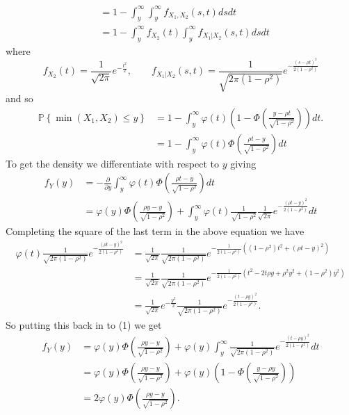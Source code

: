 \documentclass[12pt]{article}
\theoremstyle{definition}
\begin{document}
\begin{enumerate}
\begin{enumerate}
\begin{align*}
&= 1 - \int_{y}^{\infty} \int_y^{\infty} f_{X_1,X_2}(s,t)dsdt \\
&= 1 -\int_y^{\infty} f_{X_2}(t)\int_y^{\infty} f_{X_1|X_2}(s,t) ds dt
\end{align*}
where 
\[
f_{X_2} (t)=\frac{1}{\sqrt{2\pi}}e^{-\frac{t^2}{2}}, \qquad f_{X_1|X_2}(s,t)=\frac{1}{\sqrt{2\pi(1-\rho^2)}}e^{-\frac{(s-\rho t)^2}{2(1-\rho^2)}}
\]
and so
\begin{align*}
\mathbb{P}\left\{\min(X_1,X_2) \leq y\right\} &= 1 - \int_{y}^{\infty} \varphi(t) \left(1 - \Phi\left( \frac{y -\rho t}{\sqrt{1-\rho^2}}\right) \right) dt. \\
&= 1 - \int_{y}^{\infty} \varphi(t) \Phi\left( \frac{\rho t - y }{\sqrt{1-\rho^2}} \right) dt
\end{align*}
To get the density we differentiate with respect to $y$ giving
\begin{align*}
f_{Y}(y) &= -\frac{\partial}{\partial y}\int_{y}^{\infty}\varphi(t)\Phi\left(\frac{\rho t - y}{\sqrt{1-\rho^2}}\right) dt \\
&= \varphi(y)\Phi\left(\frac{\rho y - y}{\sqrt{1-\rho^2}}\right) + \int_{y}^{\infty}\varphi(t) \frac{1}{\sqrt{1-\rho^2}}\frac{1}{\sqrt{2\pi}}e^{-\frac{(\rho t - y)^2}{2(1-\rho^2)}}dt \tag{1}
\end{align*}
Completing the square of the last term in the above equation we have
\begin{align*}
\varphi(t)\frac{1}{\sqrt{2\pi(1-\rho^2)}}e^{-\frac{(\rho t-y)^2}{2(1-\rho^2)}} &= \frac{1}{\sqrt{2\pi}}\frac{1}{\sqrt{2\pi(1-\rho^2)}}e^{-\frac{1}{2(1-\rho^2)}\left((1-\rho^2)t^2 +(\rho t -y)^2  \right)} \\
&=\frac{1}{\sqrt{2\pi}}\frac{1}{\sqrt{2\pi(1-\rho^2)}}e^{-\frac{1}{2(1-\rho^2)}\left(t^2 - 2 t \rho y + \rho^2 y^2 + (1-\rho^2)y^2  \right)} \\
&= \frac{1}{\sqrt{2\pi}}e^{-\frac{y^2}{2}}\frac{1}{\sqrt{2\pi(1-\rho^2)}}e^{-\frac{(t-\rho y)^2}{2(1-\rho^2)}}.
\end{align*}
So putting this back in to (1) we get
\begin{align*}
f_{Y}(y) &= \varphi(y)\Phi\left(\frac{\rho y -y}{\sqrt{1-\rho^2}}\right) + \varphi(y)\int_y^{\infty} \frac{1}{\sqrt{2\pi(1-\rho^2)}}e^{-\frac{(t-\rho y)^2}{2(1-\rho^2)}}dt \\
&= \varphi(y)\Phi\left(\frac{\rho y -y}{\sqrt{1-\rho^2}}\right) +  \varphi(y)\left( 1 - \Phi\left(\frac{y - \rho y}{\sqrt{1-\rho^2}}\right)\right) \\
&= 2\varphi(y)\Phi\left(\frac{\rho y -y}{\sqrt{1-\rho^2}}\right).

\end{align*}
\end{enumerate}
\end{enumerate}
\end{document}
